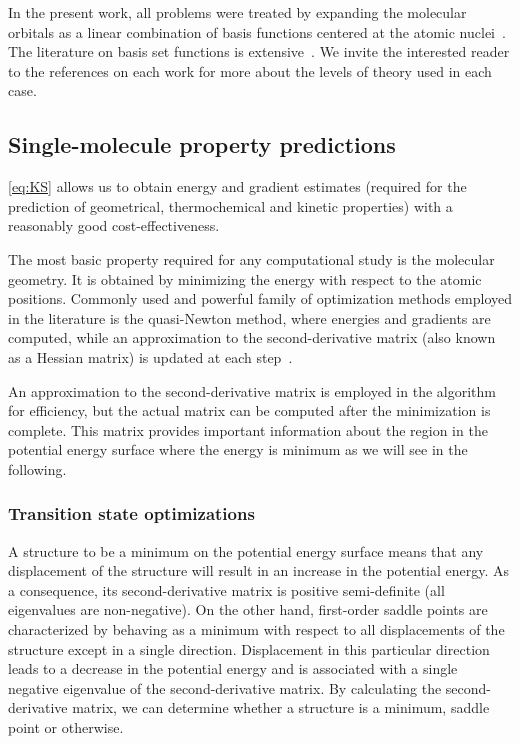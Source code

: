 In the present work, all problems were treated by expanding the molecular
orbitals as a linear combination of basis functions centered at the atomic
nuclei~\cite{Szabo_1996,Helgaker_1997,Jensen_2012,Hill_2012}.
The literature on basis set functions is extensive~\cite{Ditchfield_1971,Hehre_1972,Hariharan_1973,Hariharan_1974,Gordon_1980,Francl_1982,Clark_1983,Frisch_1984,Binning_1990,Blaudeau_1997,Rassolov_1998,Rassolov_2001}.
We invite the interested reader to the references on each work for more about
the levels of theory used in each case.

\subsection{Single-molecule property predictions}\label{sec:optimizations}

\cref{eq:KS} allows us to obtain energy and gradient estimates (required for
the prediction of geometrical, thermochemical and kinetic properties) with a
reasonably good cost-effectiveness.

The most basic property required for any computational study is the molecular
geometry.
It is obtained by minimizing the energy with respect to the atomic positions.
Commonly used and powerful family of optimization methods employed in the
literature is the quasi-Newton method, where energies and gradients are
computed, while an approximation to the second-derivative matrix (also known as
a Hessian matrix) is updated at each step~\cite{Banerjee_1985,Schlegel_1987}.

An approximation to the second-derivative matrix is employed in the algorithm
for efficiency, but the actual matrix can be computed after the minimization is
complete.
This matrix provides important information about the region in the potential
energy surface where the energy is minimum as we will see in the following.

\subsubsection{Transition state optimizations}\label{sec:ts-optimizations}

A structure to be a minimum on the potential energy surface means that any
displacement of the structure will result in an increase in the potential
energy.
As a consequence, its second-derivative matrix
is positive semi-definite (all eigenvalues are non-negative).
On the other hand, first-order saddle points are characterized by behaving as
a minimum with respect to all displacements of the structure except in a single
direction.
Displacement in this particular direction leads to a decrease in the potential
energy and is associated with a single negative eigenvalue of the
second-derivative matrix.
By calculating the second-derivative matrix, we can determine whether a structure
is a minimum, saddle point or otherwise.

